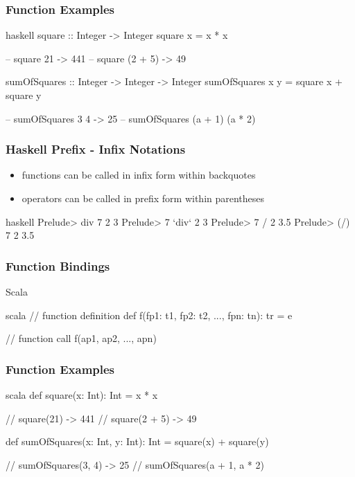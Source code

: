 \documentclass[dvipsnames]{beamer}
\theoremstyle{plain}
\begin{document}
\begin{frame}[fragile]
  \frametitle{Function Examples}

  \begin{example}[Haskell]
    \begin{pygments}{haskell}
square :: Integer -> Integer
square x = x * x

-- square 21 -> 441
-- square (2 + 5) -> 49

sumOfSquares :: Integer -> Integer -> Integer
sumOfSquares x y = square x + square y

-- sumOfSquares 3 4 -> 25
-- sumOfSquares (a + 1) (a * 2)
    \end{pygments}
  \end{example}
\end{frame}

\begin{frame}[fragile]
  \frametitle{Haskell Prefix - Infix Notations}

  \begin{itemize}
    \item functions can be called in infix form within backquotes
    \item operators can be called in prefix form within parentheses
  \end{itemize}

  \begin{example}
    \begin{pygments}{haskell}
Prelude> div 7 2
3
Prelude> 7 `div` 2
3
Prelude> 7 / 2
3.5
Prelude> (/) 7 2
3.5
    \end{pygments}
  \end{example}
\end{frame}

\begin{frame}[fragile]
  \frametitle{Function Bindings}

  \begin{block}{Scala}
    \begin{pygments}{scala}
// function definition
def f(fp1: t1, fp2: t2, ..., fpn: tn): tr = e

// function call
f(ap1, ap2, ..., apn)
    \end{pygments}
  \end{block}
\end{frame}

\begin{frame}[fragile]
  \frametitle{Function Examples}

  \begin{example}[Scala]
    \begin{pygments}{scala}
def square(x: Int): Int = x * x

// square(21) -> 441
// square(2 + 5) -> 49

def sumOfSquares(x: Int, y: Int): Int =
    square(x) + square(y)

// sumOfSquares(3, 4) -> 25
// sumOfSquares(a + 1, a * 2)
    \end{pygments}
  \end{example}
\end{frame}
\end{document}
